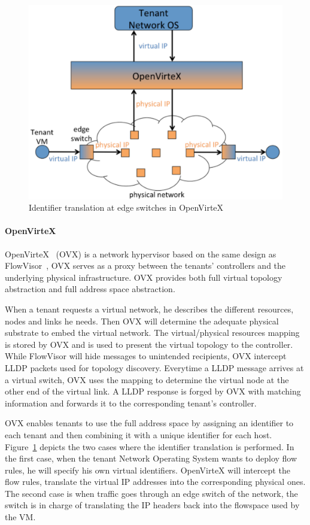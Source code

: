 \begin{figure}[h]
    \centering
    \includegraphics[scale=0.7]{figures/openvirtex.pdf}
    \caption{Identifier translation at edge switches in OpenVirteX~\cite{OpenVirteX-Al-Shabibi2014}}
    \label{fig:openvirtex}
\end{figure}

\paragraph{OpenVirteX}
OpenVirteX~\cite{OpenVirteX-Al-Shabibi2014} (OVX) is a network hypervisor based on the same design as FlowVisor~\cite{FlowVisor-Sherwood2009}, \ie OVX serves as a proxy between the tenants' controllers and the underlying physical infrastructure. OVX provides both full virtual topology abstraction and full address space abstraction. 

When a tenant requests a virtual network, he describes the different resources, nodes and links he needs.
Then OVX will determine the adequate physical substrate to embed the virtual network.
The virtual/physical resources mapping is stored by OVX and is used to present the virtual topology to the controller.
While FlowVisor will hide messages to unintended recipients, OVX intercept LLDP packets used for topology discovery. Everytime a LLDP message arrives at a virtual switch, OVX uses the mapping to determine the virtual node at the other end of the virtual link. A LLDP response is forged by OVX with matching information and forwards it to the corresponding tenant's controller.

OVX enables tenants to use the full address space by assigning an identifier to each tenant and then combining it with a unique identifier for each host. Figure~\ref{fig:openvirtex} depicts the two cases where the identifier translation is performed. In the first case, when the tenant Network Operating System wants to deploy flow rules, he will specify his own virtual identifiers. OpenVirteX will intercept the flow rules, translate the virtual IP addresses into the corresponding physical ones. The second case is when traffic goes through an edge switch of the network, the switch is in charge of translating the IP headers back into the flowspace used by the VM.

